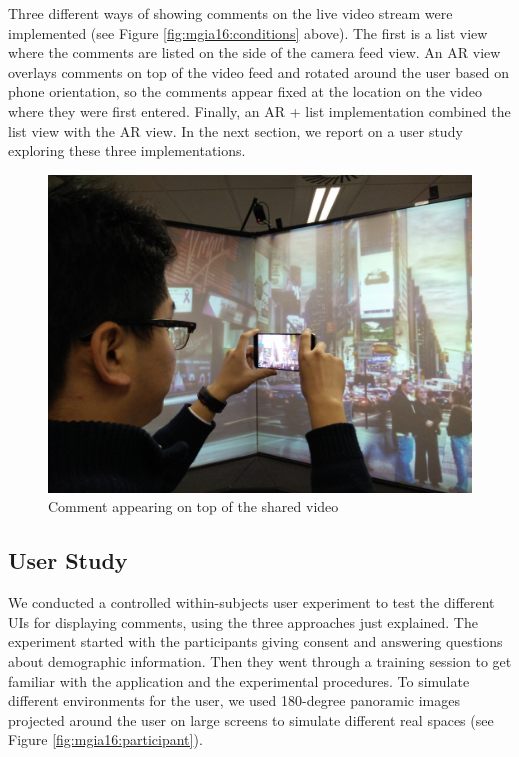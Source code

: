 Three different ways of showing comments on the live video stream were implemented (see Figure \ref{fig:mgia16:conditions} above). The first is a list view where the comments are listed on the side of the camera feed view. An AR view overlays comments on top of the video feed and rotated around the user based on phone orientation, so the comments appear fixed at the location on the video where they were first entered. Finally, an AR + list implementation combined the list view with the AR view. In the next section, we report on a user study exploring these three implementations.
\begin{figure}[ht]
  \centering
  \includegraphics[width=.8\linewidth]{images/mgia16/participant2}
  \caption{Comment appearing on top of the shared video}
	\label{comments}
\end{figure}


\subsection{User Study}

We conducted a controlled within-subjects user experiment to test the different UIs for displaying comments, using the three approaches just explained. The experiment started with the participants giving consent and answering questions about demographic information. Then they went through a training session to get familiar with the application and the experimental procedures. To simulate different environments for the user, we used 180-degree panoramic images projected around the user on large screens to simulate different real spaces (see Figure \ref{fig:mgia16:participant}).

